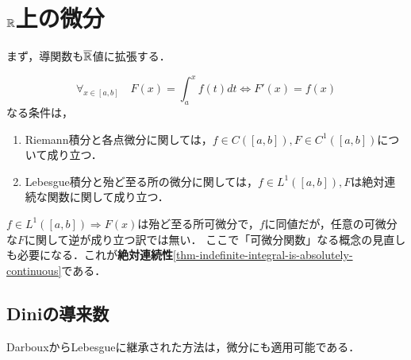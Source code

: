\documentclass[uplatex, dvipdfmx]{jsreport}
\begin{document}
\section{$\mathbb{R}$上の微分}

\begin{tcolorbox}[colframe=ForestGreen, colback=ForestGreen!10!white,breakable,colbacktitle=ForestGreen!40!white,coltitle=black,fonttitle=\bfseries\sffamily,
title=]
    まず，導関数も$\overline{\mathbb{R}}$値に拡張する．
\end{tcolorbox}

\begin{theorem}
    \[\forall_{x\in[a,b]}\quad F(x)=\int^x_af(t)dt\Leftrightarrow F'(x)=f(x)\]
    なる条件は，
    \begin{enumerate}
        \item Riemann積分と各点微分に関しては，$f\in C([a,b]),F\in C^1([a,b])$について成り立つ．
        \item Lebesgue積分と殆ど至る所の微分に関しては，$f\in L^1([a,b]),F$は絶対連続な関数に関して成り立つ．
    \end{enumerate}
\end{theorem}
\begin{remarks}
    $f\in L^1([a,b])\Rightarrow F(x)$は殆ど至る所可微分で，$f$に同値だが，任意の可微分な$F$に関して逆が成り立つ訳では無い．
    ここで「可微分関数」なる概念の見直しも必要になる．これが\textbf{絶対連続性}\ref{thm-indefinite-integral-is-absolutely-continuous}である．
\end{remarks}

\subsection{Diniの導来数}

\begin{tcolorbox}[colframe=ForestGreen, colback=ForestGreen!10!white,breakable,colbacktitle=ForestGreen!40!white,coltitle=black,fonttitle=\bfseries\sffamily,
title=]
    DarbouxからLebesgueに継承された方法は，微分にも適用可能である．
\end{tcolorbox}
\end{document}
